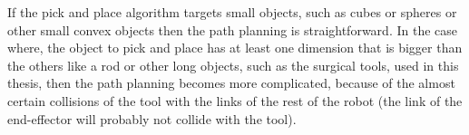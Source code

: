If the pick and place algorithm targets small objects, such as cubes or spheres or other small convex objects then the path planning is straightforward. In the case where, the object to pick and place has at least one 
dimension that is bigger than the others like a rod or other long objects, such as the surgical tools, used in this thesis, then the path planning becomes more complicated, because of the almost certain collisions 
of the tool with the links of the rest of the robot (the link of the end-effector will probably not collide with the tool).